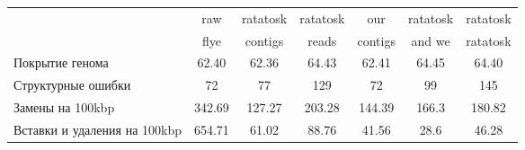\begin{minipage}{0.91\textwidth}
\begin{adjustbox}{center}
\begin{tabular}{|l||c|c|c|c|c|c|}
\hline
 & raw & ratatosk & ratatosk & our & ratatosk & ratatosk \\
 & flye & contigs & reads & contigs & and we & ratatosk \\
\hline
\hline
Покрытие генома & \cellcolor[RGB]{252, 232, 232} 62.40 & \cellcolor[RGB]{252, 232, 232} 62.36 & \cellcolor[RGB]{232, 232, 252} 64.43 & \cellcolor[RGB]{252, 232, 232} 62.41 & \cellcolor[RGB]{232, 232, 252} 64.45 & \cellcolor[RGB]{232, 232, 252} 64.40 \\
\hline
Структурные ошибки & \cellcolor[RGB]{227, 227, 252} 72 & \cellcolor[RGB]{237, 237, 253} 77 & \cellcolor[RGB]{247, 182, 182} 129 & \cellcolor[RGB]{227, 227, 252} 72 & \cellcolor[RGB]{253, 237, 237} 99 & \cellcolor[RGB]{235, 71, 71} 145 \\
\hline
Замены на 100kbp & \cellcolor[RGB]{235, 71, 71} 342.69 & \cellcolor[RGB]{205, 205, 249} 127.27 & \cellcolor[RGB]{250, 209, 209} 203.28 & \cellcolor[RGB]{223, 223, 251} 144.39 & \cellcolor[RGB]{246, 246, 254} 166.3 & \cellcolor[RGB]{254, 246, 246} 180.82 \\
\hline
Вставки и удаления на 100kbp & \cellcolor[RGB]{235, 71, 71} 654.71 & \cellcolor[RGB]{253, 237, 237} 61.02 & \cellcolor[RGB]{245, 168, 168} 88.76 & \cellcolor[RGB]{227, 227, 252} 41.56 & \cellcolor[RGB]{200, 200, 249} 28.6 & \cellcolor[RGB]{237, 237, 253} 46.28 \\
\hline
\end{tabular}
\end{adjustbox}
\end{minipage}
